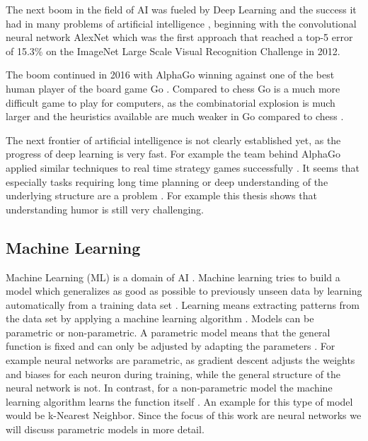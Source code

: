 \documentclass[draft,final,oneside]{vutinfth} %
\begin{document}
The next boom in the field of AI was fueled by Deep Learning and the success it had in many problems of artificial intelligence \cite{selfdriving}\cite{nmt}\cite{speech}, beginning with the convolutional neural network AlexNet which was the first approach that reached a top-5 error of 15.3\% on the ImageNet Large Scale Visual Recognition Challenge in 2012. \cite{alexnet}

The boom continued in 2016 with AlphaGo winning against one of the best human player of the board game Go \cite{alphagopaper}. Compared to chess Go is a much more difficult game to play for computers, as the combinatorial explosion is much larger and the heuristics available are much weaker in Go compared to chess \cite{alphagopaper}.

The next frontier of artificial intelligence is not clearly established yet, as the progress of deep learning is very fast. For example the team behind AlphaGo applied similar techniques to real time strategy games successfully \cite{arulkumaran2019alphastar}. It seems that especially tasks requiring long time planning or deep understanding of the underlying structure are a problem \cite{atariplaying}. For example this thesis shows that understanding humor is still very challenging.


\subsection{Machine Learning}

Machine Learning (ML) is a domain of AI \cite{aimodern}. Machine learning tries to build a model which generalizes as good as possible to previously unseen data by learning automatically from a training data set \cite{bishop}. Learning means extracting patterns from the data set by applying a machine learning algorithm \cite{bishop}. Models can be parametric or non-parametric. A parametric model means that the general function is fixed and can only be adjusted by adapting the parameters \cite{aimodern}. For example neural networks are parametric, as gradient descent adjusts the weights and biases for each neuron during training, while the general structure of the neural network is not. In contrast, for a non-parametric model the machine learning algorithm learns the function itself \cite{aimodern}. An example for this type of model would be k-Nearest Neighbor.  Since the focus of this work are neural networks we will discuss parametric models in more detail.
\end{document}

